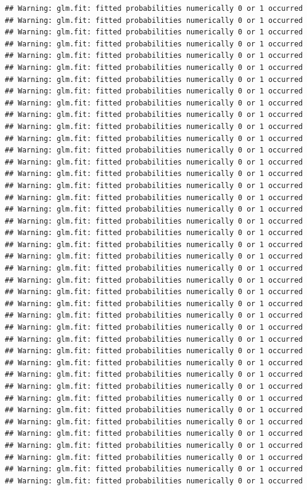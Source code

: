 \documentclass[
]{article}
\begin{document}
\begin{verbatim}
## Warning: glm.fit: fitted probabilities numerically 0 or 1 occurred
## Warning: glm.fit: fitted probabilities numerically 0 or 1 occurred
## Warning: glm.fit: fitted probabilities numerically 0 or 1 occurred
## Warning: glm.fit: fitted probabilities numerically 0 or 1 occurred
## Warning: glm.fit: fitted probabilities numerically 0 or 1 occurred
## Warning: glm.fit: fitted probabilities numerically 0 or 1 occurred
## Warning: glm.fit: fitted probabilities numerically 0 or 1 occurred
## Warning: glm.fit: fitted probabilities numerically 0 or 1 occurred
## Warning: glm.fit: fitted probabilities numerically 0 or 1 occurred
## Warning: glm.fit: fitted probabilities numerically 0 or 1 occurred
## Warning: glm.fit: fitted probabilities numerically 0 or 1 occurred
## Warning: glm.fit: fitted probabilities numerically 0 or 1 occurred
## Warning: glm.fit: fitted probabilities numerically 0 or 1 occurred
## Warning: glm.fit: fitted probabilities numerically 0 or 1 occurred
## Warning: glm.fit: fitted probabilities numerically 0 or 1 occurred
## Warning: glm.fit: fitted probabilities numerically 0 or 1 occurred
## Warning: glm.fit: fitted probabilities numerically 0 or 1 occurred
## Warning: glm.fit: fitted probabilities numerically 0 or 1 occurred
## Warning: glm.fit: fitted probabilities numerically 0 or 1 occurred
## Warning: glm.fit: fitted probabilities numerically 0 or 1 occurred
## Warning: glm.fit: fitted probabilities numerically 0 or 1 occurred
## Warning: glm.fit: fitted probabilities numerically 0 or 1 occurred
## Warning: glm.fit: fitted probabilities numerically 0 or 1 occurred
## Warning: glm.fit: fitted probabilities numerically 0 or 1 occurred
## Warning: glm.fit: fitted probabilities numerically 0 or 1 occurred
## Warning: glm.fit: fitted probabilities numerically 0 or 1 occurred
## Warning: glm.fit: fitted probabilities numerically 0 or 1 occurred
## Warning: glm.fit: fitted probabilities numerically 0 or 1 occurred
## Warning: glm.fit: fitted probabilities numerically 0 or 1 occurred
## Warning: glm.fit: fitted probabilities numerically 0 or 1 occurred
## Warning: glm.fit: fitted probabilities numerically 0 or 1 occurred
## Warning: glm.fit: fitted probabilities numerically 0 or 1 occurred
## Warning: glm.fit: fitted probabilities numerically 0 or 1 occurred
## Warning: glm.fit: fitted probabilities numerically 0 or 1 occurred
## Warning: glm.fit: fitted probabilities numerically 0 or 1 occurred
## Warning: glm.fit: fitted probabilities numerically 0 or 1 occurred
## Warning: glm.fit: fitted probabilities numerically 0 or 1 occurred
## Warning: glm.fit: fitted probabilities numerically 0 or 1 occurred
## Warning: glm.fit: fitted probabilities numerically 0 or 1 occurred
## Warning: glm.fit: fitted probabilities numerically 0 or 1 occurred
## Warning: glm.fit: fitted probabilities numerically 0 or 1 occurred
\end{verbatim}
\end{document}
